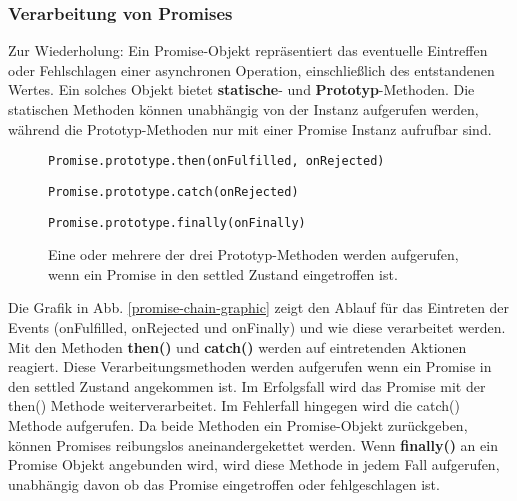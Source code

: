 \subsubsection{Verarbeitung von Promises}

Zur Wiederholung: Ein Promise-Objekt repräsentiert das eventuelle Eintreffen oder Fehlschlagen einer asynchronen Operation, einschließlich des entstandenen Wertes. Ein solches Objekt bietet \textbf{statische}- und \textbf{Prototyp}-Methoden. Die statischen Methoden können unabhängig von der Instanz aufgerufen werden, während die Prototyp-Methoden nur mit einer Promise Instanz aufrufbar sind.

\begin{description}

\begin{figure}[H]
\item \begin{lstlisting}[basicstyle=\small]
Promise.prototype.then(onFulfilled, onRejected)
\end{lstlisting}

\item \begin{lstlisting}[basicstyle=\small]
Promise.prototype.catch(onRejected)
\end{lstlisting}


\item \begin{lstlisting}[basicstyle=\small]
Promise.prototype.finally(onFinally)
\end{lstlisting}
\caption{Eine oder mehrere der drei Prototyp-Methoden werden aufgerufen, wenn ein Promise in den settled Zustand eingetroffen ist.}
\end{figure}

\end{description}

\noindent
Die Grafik in Abb. \ref{promise-chain-graphic} zeigt den Ablauf für das Eintreten der Events (onFulfilled, onRejected und onFinally) und wie diese verarbeitet werden. Mit den Methoden \textbf{then()} und \textbf{catch()} werden auf eintretenden Aktionen reagiert. Diese Verarbeitungsmethoden werden aufgerufen wenn ein Promise in den settled Zustand angekommen ist. Im Erfolgsfall wird das Promise mit der then() Methode weiterverarbeitet. Im Fehlerfall hingegen wird die catch() Methode aufgerufen. Da beide Methoden ein Promise-Objekt zurückgeben, können Promises reibungslos aneinandergekettet werden. Wenn \textbf{finally()} an ein Promise Objekt angebunden wird, wird diese Methode in jedem Fall aufgerufen, unabhängig davon ob das Promise eingetroffen oder fehlgeschlagen ist.

